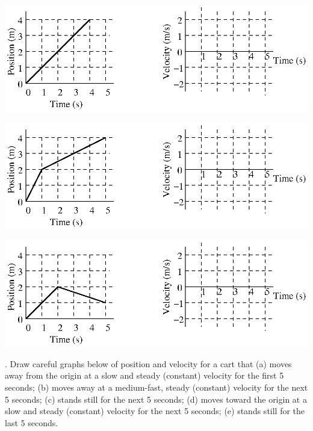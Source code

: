 \vspace{0.3cm}
{\par\centering \includegraphics{relating/relating_fig3.eps} \par}
\vspace{0.3cm}

\vspace{0.3cm}
{\par\centering \includegraphics{relating/relating_fig4.eps} \par}
\vspace{0.3cm}

\vspace{0.3cm}
{\par\centering \includegraphics{relating/relating_fig5.eps} \par}
\vspace{0.3cm}

. Draw careful graphs below of position and velocity for a cart that (a) moves
away from the origin at a slow and steady (constant) velocity for the first
5 seconds; (b) moves away at a medium-fast, steady (constant) velocity for the
next 5 seconds; (c) stands still for the next 5 seconds; (d) moves toward the
origin at a slow and steady (constant) velocity for the next 5 seconds; (e)
stands still for the last 5 seconds.

